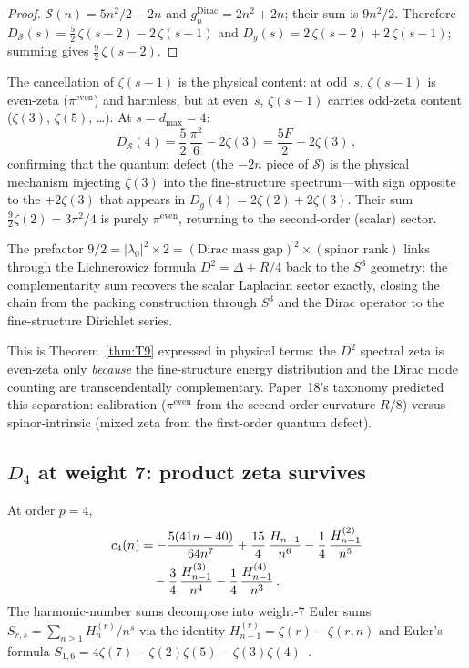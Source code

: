 \documentclass[11pt]{article}
\begin{document}
\begin{proof}
$\mathcal{S}(n) = 5n^2/2 - 2n$ and $g_n^{\mathrm{Dirac}} = 2n^2 + 2n$;
their sum is $9n^2/2$.  Therefore
$D_{\mathcal{S}}(s) = \tfrac{5}{2}\,\zeta(s{-}2) - 2\,\zeta(s{-}1)$
and $D_{g}(s) = 2\,\zeta(s{-}2) + 2\,\zeta(s{-}1)$; summing gives
$\tfrac{9}{2}\,\zeta(s{-}2)$.
\end{proof}

The cancellation of $\zeta(s{-}1)$ is the physical content: at odd~$s$,
$\zeta(s{-}1)$ is even-zeta ($\pi^{\mathrm{even}}$) and harmless, but
at even~$s$, $\zeta(s{-}1)$ carries odd-zeta content ($\zeta(3)$,
$\zeta(5)$, \ldots).  At $s = d_{\max} = 4$:
\begin{equation}
  D_{\mathcal{S}}(4) = \frac{5}{2}\,\frac{\pi^2}{6} - 2\zeta(3)
  = \frac{5F}{2} - 2\zeta(3)\,,
\end{equation}
confirming that the quantum defect (the $-2n$ piece of $\mathcal{S}$)
is the physical mechanism injecting $\zeta(3)$ into the fine-structure
spectrum---with sign opposite to the $+2\zeta(3)$ that appears in
$D_{g}(4) = 2\zeta(2) + 2\zeta(3)$.  Their sum
$\tfrac{9}{2}\zeta(2) = 3\pi^2/4$ is purely $\pi^{\mathrm{even}}$,
returning to the second-order (scalar) sector.

The prefactor $9/2 = |\lambda_0|^2 \times 2 =
(\text{Dirac mass gap})^2 \times (\text{spinor rank})$
links through the Lichnerowicz formula $D^2 = \Delta + R/4$
back to the $S^3$ geometry: the complementarity sum
recovers the scalar Laplacian sector exactly, closing the chain
from the packing construction through $S^3$ and the Dirac operator
to the fine-structure Dirichlet series.

This is Theorem~\ref{thm:T9} expressed in physical terms:
the $D^2$ spectral zeta is even-zeta only \emph{because} the
fine-structure energy distribution and the Dirac mode counting
are transcendentally complementary.
Paper~18's taxonomy predicted this separation: calibration
($\pi^{\mathrm{even}}$ from the second-order curvature $R/8$) versus
spinor-intrinsic (mixed zeta from the first-order quantum defect).

\subsection{$D_4$ at weight 7: product zeta survives}

At order $p = 4$,
\begin{align}
  c_4(n) &= -\frac{5(41n - 40)}{64n^7}
    + \frac{15}{4}\,\frac{H_{n-1}}{n^6}
    - \frac{1}{4}\,\frac{H_{n-1}^{(2)}}{n^5}
    \notag \\
    &\quad - \frac{3}{4}\,\frac{H_{n-1}^{(3)}}{n^4}
    - \frac{1}{4}\,\frac{H_{n-1}^{(4)}}{n^3}\,.
\end{align}
The harmonic-number sums decompose into weight-7 Euler sums
$S_{r,s} = \sum_{n \ge 1} H_n^{(r)} / n^s$ via the identity
$H_{n-1}^{(r)} = \zeta(r) - \zeta(r,n)$ and Euler's formula
$S_{1,6} = 4\zeta(7) - \zeta(2)\zeta(5) - \zeta(3)\zeta(4)$~\cite{flajolet1998}.
\end{document}
